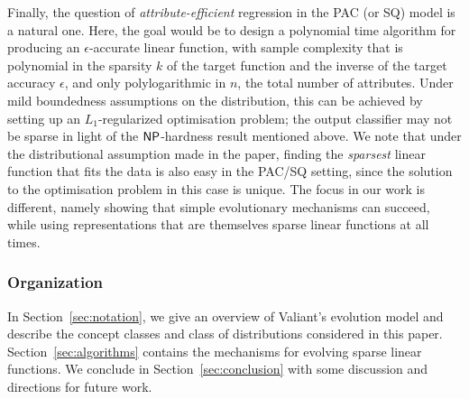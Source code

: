 Finally, the question of \emph{attribute-efficient} regression in the PAC (or
SQ) model is a natural one. Here, the goal would be to design a polynomial time
algorithm for producing an $\epsilon$-accurate linear function, with sample
complexity that is polynomial in the sparsity $k$ of the target function and the
inverse of the target accuracy $\epsilon$, and only polylogarithmic in $n$, the
total number of attributes. Under mild boundedness assumptions on the
distribution, this can be achieved by setting up an $L_1$-regularized
optimisation problem; the output classifier may not be sparse in light of the
$\mathsf{NP}$-hardness result mentioned above. We note that under the distributional
assumption made in the paper, finding the \emph{sparsest} linear function that
fits the data is also easy in the PAC/SQ setting, since the solution to the
optimisation problem in this case is unique. The focus in our work is different,
namely showing that simple evolutionary mechanisms can succeed, while using
representations that are themselves sparse linear functions at all times.


\subsubsection*{Organization}

In Section~\ref{sec:notation}, we give an overview of Valiant's evolution model
and describe the concept classes and class of distributions considered in this
paper.  Section~\ref{sec:algorithms} contains the mechanisms for evolving sparse
linear functions. We conclude in Section~\ref{sec:conclusion} with some
discussion and directions for future work.
